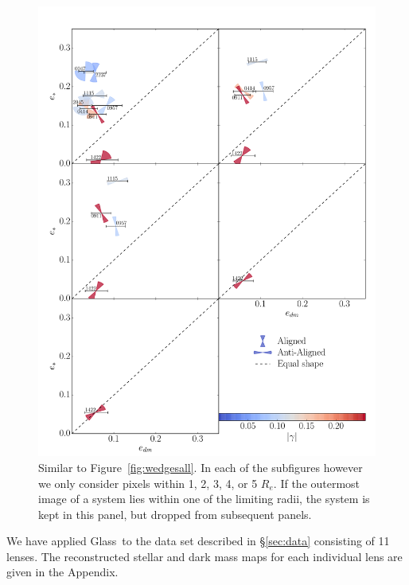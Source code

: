 \documentclass[useAMS,usenatbib]{mn2e}
\def\Glass{{\sc Glass}}
\begin{document}
\begin{figure}
  \centering
  \includegraphics[width=.8\linewidth]{Figures/wedges.pdf}
  \caption[width=\linewidth]{Similar to Figure~\ref{fig:wedgesall}. In each of the subfigures however we only consider pixels within 1, 2, 3, 4, or 5 $R_e$. If the outermost image of a system lies within one of the limiting radii, the system is kept in this panel, but dropped from subsequent panels.}
  \label{fig:wedgesradii}
\end{figure}

We have applied \Glass\ to the data set described in \S\ref{sec:data} consisting of 11 lenses. The reconstructed stellar and dark mass maps for each individual lens are given in the Appendix.
\end{document}
